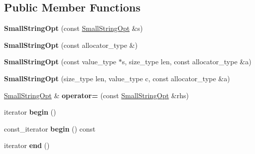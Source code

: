\subsection*{Public Member Functions}
\begin{DoxyCompactItemize}
\item 
\hypertarget{classSmallStringOpt_a0e043f4ed81dbd4034a834aa299c348f}{}{\bfseries Small\+String\+Opt} (const \hyperlink{classSmallStringOpt}{Small\+String\+Opt} \&s)\label{classSmallStringOpt_a0e043f4ed81dbd4034a834aa299c348f}

\item 
\hypertarget{classSmallStringOpt_a8d5dd4560b1063e5fbb59998a65a8356}{}{\bfseries Small\+String\+Opt} (const allocator\+\_\+type \&)\label{classSmallStringOpt_a8d5dd4560b1063e5fbb59998a65a8356}

\item 
\hypertarget{classSmallStringOpt_a136ae5b8d1b8d8383bdfbccd4bb6cdf8}{}{\bfseries Small\+String\+Opt} (const value\+\_\+type $\ast$s, size\+\_\+type len, const allocator\+\_\+type \&a)\label{classSmallStringOpt_a136ae5b8d1b8d8383bdfbccd4bb6cdf8}

\item 
\hypertarget{classSmallStringOpt_a3da612284ca1777c66a4dc29434de9a7}{}{\bfseries Small\+String\+Opt} (size\+\_\+type len, value\+\_\+type c, const allocator\+\_\+type \&a)\label{classSmallStringOpt_a3da612284ca1777c66a4dc29434de9a7}

\item 
\hypertarget{classSmallStringOpt_a49204aed714a5bb731599e304285a245}{}\hyperlink{classSmallStringOpt}{Small\+String\+Opt} \& {\bfseries operator=} (const \hyperlink{classSmallStringOpt}{Small\+String\+Opt} \&rhs)\label{classSmallStringOpt_a49204aed714a5bb731599e304285a245}

\item 
\hypertarget{classSmallStringOpt_afbc94c8e7c4e2001052d445c5857c3d2}{}iterator {\bfseries begin} ()\label{classSmallStringOpt_afbc94c8e7c4e2001052d445c5857c3d2}

\item 
\hypertarget{classSmallStringOpt_a727d95214948dc69721ca42a168070c3}{}const\+\_\+iterator {\bfseries begin} () const \label{classSmallStringOpt_a727d95214948dc69721ca42a168070c3}

\item 
\hypertarget{classSmallStringOpt_ac3811fcdf6e665caa9b3d59f6fa63115}{}iterator {\bfseries end} ()\label{classSmallStringOpt_ac3811fcdf6e665caa9b3d59f6fa63115}


\end{DoxyCompactItemize}
